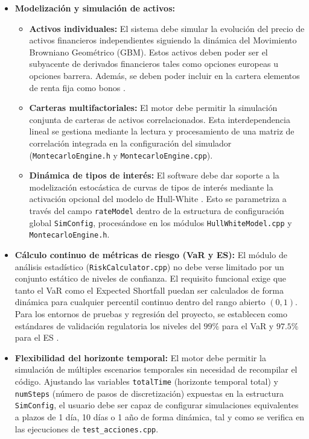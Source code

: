\documentclass[11pt]{article}
\begin{document}
\begin{itemize}
    \item \textbf{Modelización y simulación de activos:}
    \begin{itemize}
        \item \textbf{Activos individuales:} El sistema debe simular la evolución del precio de activos financieros independientes siguiendo la dinámica del Movimiento Browniano Geométrico (GBM). Estos activos deben poder ser el subyacente de derivados financieros tales como opciones europeas u opciones barrera. Además, se deben poder incluir en la cartera elementos de renta fija como bonos \cite{options2018hull}.
        \item \textbf{Carteras multifactoriales:} El motor debe permitir la simulación conjunta de carteras de activos correlacionados. Esta interdependencia lineal se gestiona mediante la lectura y procesamiento de una matriz de correlación integrada en la configuración del simulador (\texttt{MontecarloEngine.h} y \texttt{MontecarloEngine.cpp}).
        \item \textbf{Dinámica de tipos de interés:} El software debe dar soporte a la modelización estocástica de curvas de tipos de interés mediante la activación opcional del modelo de Hull-White \cite{options2018hull}. Esto se parametriza a través del campo \texttt{rateModel} dentro de la estructura de configuración global \texttt{SimConfig}, procesándose en los módulos \texttt{HullWhiteModel.cpp} y \texttt{MontecarloEngine.h}.
    \end{itemize}

    \item \textbf{Cálculo continuo de métricas de riesgo (VaR y ES):}
    El módulo de análisis estadístico (\texttt{RiskCalculator.cpp}) no debe verse limitado por un conjunto estático de niveles de confianza. El requisito funcional exige que tanto el VaR como el Expected Shortfall puedan ser calculados de forma dinámica para cualquier percentil continuo dentro del rango abierto $(0, 1)$. Para los entornos de pruebas y regresión del proyecto, se establecen como estándares de validación regulatoria los niveles del $99\%$ para el VaR y $97.5\%$ para el ES \cite{bcbs2013frtb}.

    \item \textbf{Flexibilidad del horizonte temporal:}
    El motor debe permitir la simulación de múltiples escenarios temporales sin necesidad de recompilar el código. Ajustando las variables \texttt{totalTime} (horizonte temporal total) y \texttt{numSteps} (número de pasos de discretización) expuestas en la estructura \texttt{SimConfig}, el usuario debe ser capaz de configurar simulaciones equivalentes a plazos de 1 día, 10 días o 1 año de forma dinámica, tal y como se verifica en las ejecuciones de \texttt{test\_acciones.cpp}.
\end{itemize}
\end{document}
